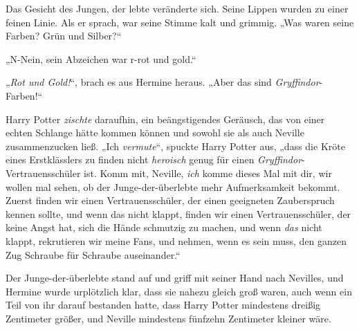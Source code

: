 Das Gesicht des Jungen, der lebte veränderte sich. Seine Lippen wurden zu einer feinen Linie. Als er sprach, war seine Stimme kalt und grimmig. „Was waren seine Farben? Grün und Silber?“

„N-Nein, sein Abzeichen war r-rot und gold.“

„\emph{Rot und Gold!}“, brach es aus Hermine heraus. „Aber das sind \emph{Gryffindor}-Farben!“

Harry Potter \emph{zischte} daraufhin, ein beängstigendes Geräusch, das von einer echten Schlange hätte kommen können und sowohl sie als auch Neville zusammenzucken ließ. „Ich \emph{vermute}“, spuckte Harry Potter aus, „dass die Kröte eines Erstklässlers zu finden nicht \emph{heroisch} genug für einen \emph{Gryffindor}-Vertrauensschüler ist. Komm mit, Neville, \emph{ich} komme dieses Mal mit dir, wir wollen mal sehen, ob der Junge-der-überlebte mehr Aufmerksamkeit bekommt. Zuerst finden wir einen Vertrauensschüler, der einen geeigneten Zauberspruch kennen sollte, und wenn das nicht klappt, finden wir einen Vertrauensschüler, der keine Angst hat, sich die Hände schmutzig zu machen, und wenn \emph{das} nicht klappt, rekrutieren wir meine Fans, und nehmen, wenn es sein muss, den ganzen Zug Schraube für Schraube auseinander.“

Der Junge-der-überlebte stand auf und griff mit seiner Hand nach Nevilles, und Hermine wurde urplötzlich klar, dass sie nahezu gleich groß waren, auch wenn ein Teil von ihr darauf bestanden hatte, dass Harry Potter mindestens dreißig Zentimeter größer, und Neville mindestens fünfzehn Zentimeter kleiner wäre.

